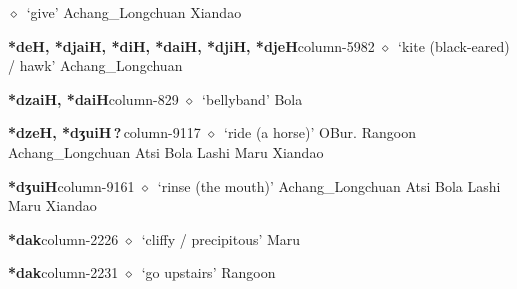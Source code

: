          $\diamond$~`give'
         Achang\_Longchuan 
\hspace{1ex}
         Xiandao 
  \item {\footnotesize \textbf{*deH, *djaiH, *diH, *daiH, *djiH, *djeH}}{\tiny column-5982}
         $\diamond$~`kite (black-eared) / hawk'
         Achang\_Longchuan 
  \item {\footnotesize \textbf{*dzaiH, *daiH}}{\tiny column-829}
         $\diamond$~`bellyband'
         Bola 
  \item {\footnotesize \textbf{*dzeH, *dʒuiH\,?\,}}{\tiny column-9117}
         $\diamond$~`ride (a horse)'
         OBur. 
\hspace{1ex}
         Rangoon 
\hspace{1ex}
         Achang\_Longchuan 
\hspace{1ex}
         Atsi 
\hspace{1ex}
         Bola 
\hspace{1ex}
         Lashi 
\hspace{1ex}
         Maru 
\hspace{1ex}
         Xiandao 
  \item {\footnotesize \textbf{*dʒuiH}}{\tiny column-9161}
         $\diamond$~`rinse (the mouth)'
         Achang\_Longchuan 
\hspace{1ex}
         Atsi 
\hspace{1ex}
         Bola 
\hspace{1ex}
         Lashi 
\hspace{1ex}
         Maru 
\hspace{1ex}
         Xiandao 
  \item {\footnotesize \textbf{*dak}}{\tiny column-2226}
         $\diamond$~`cliffy / precipitous'
         Maru 
  \item {\footnotesize \textbf{*dak}}{\tiny column-2231}
         $\diamond$~`go upstairs'
         Rangoon 
